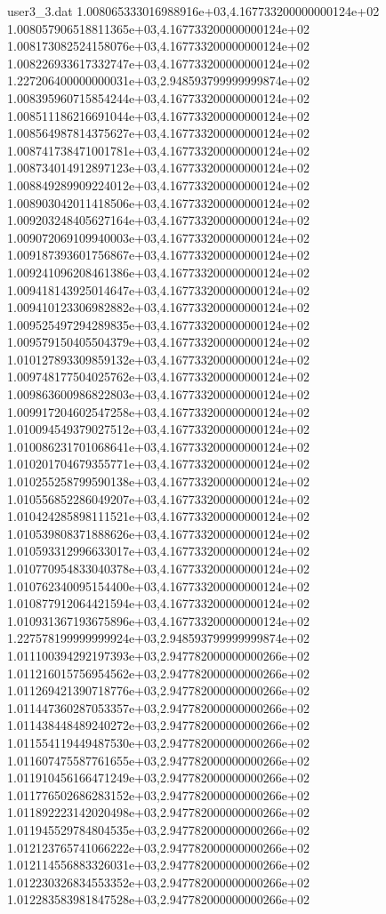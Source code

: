 \begin{filecontents}{user3_3.dat}
1.008065333016988916e+03,4.167733200000000124e+02
1.008057906518811365e+03,4.167733200000000124e+02
1.008173082524158076e+03,4.167733200000000124e+02
1.008226933617332747e+03,4.167733200000000124e+02
1.227206400000000031e+03,2.948593799999999874e+02
1.008395960715854244e+03,4.167733200000000124e+02
1.008511186216691044e+03,4.167733200000000124e+02
1.008564987814375627e+03,4.167733200000000124e+02
1.008741738471001781e+03,4.167733200000000124e+02
1.008734014912897123e+03,4.167733200000000124e+02
1.008849289909224012e+03,4.167733200000000124e+02
1.008903042011418506e+03,4.167733200000000124e+02
1.009203248405627164e+03,4.167733200000000124e+02
1.009072069109940003e+03,4.167733200000000124e+02
1.009187393601756867e+03,4.167733200000000124e+02
1.009241096208461386e+03,4.167733200000000124e+02
1.009418143925014647e+03,4.167733200000000124e+02
1.009410123306982882e+03,4.167733200000000124e+02
1.009525497294289835e+03,4.167733200000000124e+02
1.009579150405504379e+03,4.167733200000000124e+02
1.010127893309859132e+03,4.167733200000000124e+02
1.009748177504025762e+03,4.167733200000000124e+02
1.009863600986822803e+03,4.167733200000000124e+02
1.009917204602547258e+03,4.167733200000000124e+02
1.010094549379027512e+03,4.167733200000000124e+02
1.010086231701068641e+03,4.167733200000000124e+02
1.010201704679355771e+03,4.167733200000000124e+02
1.010255258799590138e+03,4.167733200000000124e+02
1.010556852286049207e+03,4.167733200000000124e+02
1.010424285898111521e+03,4.167733200000000124e+02
1.010539808371888626e+03,4.167733200000000124e+02
1.010593312996633017e+03,4.167733200000000124e+02
1.010770954833040378e+03,4.167733200000000124e+02
1.010762340095154400e+03,4.167733200000000124e+02
1.010877912064421594e+03,4.167733200000000124e+02
1.010931367193675896e+03,4.167733200000000124e+02
1.227578199999999924e+03,2.948593799999999874e+02
1.011100394292197393e+03,2.947782000000000266e+02
1.011216015756954562e+03,2.947782000000000266e+02
1.011269421390718776e+03,2.947782000000000266e+02
1.011447360287053357e+03,2.947782000000000266e+02
1.011438448489240272e+03,2.947782000000000266e+02
1.011554119449487530e+03,2.947782000000000266e+02
1.011607475587761655e+03,2.947782000000000266e+02
1.011910456166471249e+03,2.947782000000000266e+02
1.011776502686283152e+03,2.947782000000000266e+02
1.011892223142020498e+03,2.947782000000000266e+02
1.011945529784804535e+03,2.947782000000000266e+02
1.012123765741066222e+03,2.947782000000000266e+02
1.012114556883326031e+03,2.947782000000000266e+02
1.012230326834553352e+03,2.947782000000000266e+02
1.012283583981847528e+03,2.947782000000000266e+02

\end{filecontents}
